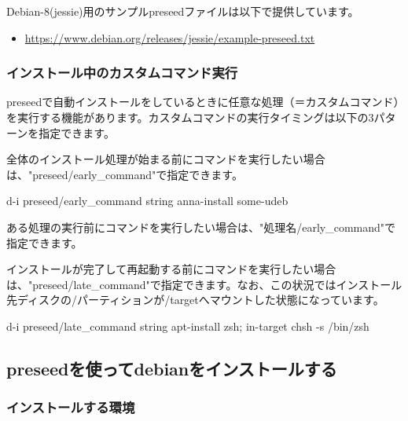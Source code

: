 \documentclass[mingoth,a4paper]{jsarticle}
\begin{document}
Debian-8(jessie)用のサンプルpreseedファイルは以下で提供しています。

\begin{itemize}
\item \url{https://www.debian.org/releases/jessie/example-preseed.txt}
\end{itemize}


\subsubsection{インストール中のカスタムコマンド実行}

preseedで自動インストールをしているときに任意な処理（＝カスタムコマンド）を実行する機能があります。カスタムコマンドの実行タイミングは以下の3パターンを指定できます。


全体のインストール処理が始まる前にコマンドを実行したい場合は、"preseed/early\_command"で指定できます。

\begin{commandline}
d-i preseed/early_command string anna-install some-udeb
\end{commandline}


ある処理の実行前にコマンドを実行したい場合は、"処理名/early\_command"で指定できます。



インストールが完了して再起動する前にコマンドを実行したい場合は、"preseed/late\_command"で指定できます。なお、この状況ではインストール先ディスクの/パーティションが/targetへマウントした状態になっています。

\begin{commandline}
d-i preseed/late_command string apt-install zsh; in-target chsh -s /bin/zsh
\end{commandline}


\subsection{preseedを使ってdebianをインストールする}

\subsubsection{インストールする環境}
\end{document}
